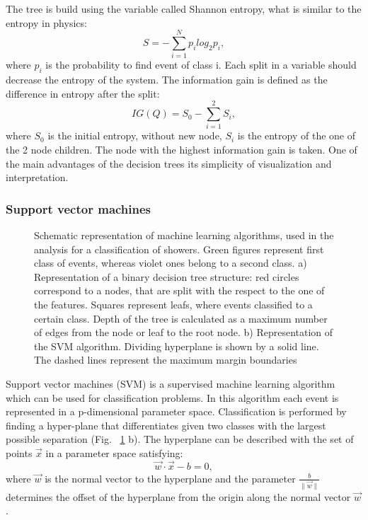 The tree is build using the variable called Shannon entropy, what is similar to the entropy in physics:
\begin{equation}
S=- \sum_{i=1}^{N} p_i log_2 p_i,
\end{equation}
where $p_i$ is the probability to find event of class i. Each split in a variable should decrease the entropy of the system. The information gain is defined as the difference in entropy after the split:
\begin{equation}
IG(Q) = S_0 - \sum_{i=1}^{2}S_i,
\end{equation}
where $S_0$ is the initial entropy, without new node, $S_i$ is the entropy of the one of the 2 node children. The node with the highest information gain is taken. One of the main advantages of the decision trees its simplicity of visualization and interpretation. 

\subsubsection{Support vector machines}

\begin{figure}[!tbp]
\begin{minipage}[h]{0.49\linewidth}
\end{minipage}
\hfill
\begin{minipage}[h]{0.49\linewidth}
\end{minipage}
\caption{Schematic representation of machine learning algorithms, used in the analysis for a classification of showers. Green figures represent first class of events, whereas violet ones belong to a second class.  
a) Representation of a binary decision tree structure: red circles correspond to a nodes, that are split with the respect to the one of the features. Squares represent leafs, where events classified to a certain class. Depth of the tree is calculated as a maximum number of edges from the node or leaf to the root node. 
b) Representation of the SVM algorithm. Dividing hyperplane is shown by a solid line. The dashed lines represent the maximum margin boundaries}
\label{fig:MLAlgo}
\end{figure}

Support vector machines (SVM) is a supervised machine learning algorithm which can be used for classification problems. In this algorithm each event is represented in a p-dimensional parameter space. Classification is performed by finding a hyper-plane that differentiates given two classes with the largest possible separation (Fig. ~\ref{fig:MLAlgo} b). The hyperplane can be described with the set of points $\vec {x}$ in a parameter space satisfying:
\begin{equation}
\vec{w}\cdot \vec{x} - b = 0,
\end{equation}
where $\vec{w}$ is the normal vector to the hyperplane and the parameter $\frac {b}{\|{\vec {w}}\|}$ determines the offset of the hyperplane from the origin along the normal vector $\vec {w}$. 

